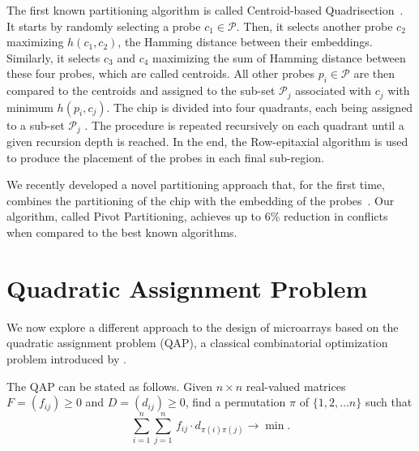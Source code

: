 \documentclass[english]{lni}
\newcommand{\ignore}[1]{}
\begin{document}
The first known partitioning algorithm is called Centroid-based
Quadrisection~\cite{KAHNG03B}. It starts by randomly selecting a probe
$c_1 \in \mathcal{P}$. Then, it selects another probe $c_2$ maximizing
$h(c_1,c_2)$, the Hamming distance between their embeddings. Similarly, it
selects $c_3$ and $c_4$ maximizing the sum of Hamming distance between these
four probes, which are called centroids. All other probes $p_i \in \mathcal{P}$
are then compared to the centroids and assigned to the sub-set $\mathcal{P}_j$
associated with $c_j$ with minimum $h(p_i,c_j)$. The chip is divided into four
quadrants, each being assigned to a sub-set $\mathcal{P}_j$ .  The procedure
is repeated recursively on each quadrant until a given recursion depth is
reached. In the end, the Row-epitaxial algorithm is used to produce the
placement of the probes in each final sub-region.

We recently developed a novel partitioning approach that, for the first
time, combines the partitioning of the chip with the embedding of the
probes~\cite{CARVALHO06}. Our algorithm, called Pivot Partitioning, achieves
up to 6\% reduction in conflicts when compared to the best known algorithms.

\ignore{
Their results show that the running time of the row-epitaxial algorithm
drops significantly with increasing recursion depth. The time required to place
the probes of a 500\,x\,500 chip, for instance, dropped by 69\% with $L = 3$
when compared with the time required by the row-epitaxial without any
partitioning.
It is not clear from their experiments, however, how the choice of $L$ impaired
the performance of the row-epitaxial algorithm in terms of solution quality
since they have restricted their experiments to $L \leq 3$. Moreover, there is
no clear trend toward reduction or increase in border length as $L$ varies
from~0 to~3.
}

\section{Quadratic Assignment Problem}
\label{sec:qap}

We now explore a different approach to the design of microarrays based on the
quadratic assignment problem (QAP), a classical combinatorial optimization
problem introduced by \cite{KOOPMANS57}.

The QAP can be stated as follows. Given $n \times n$ real-valued matrices $F =
(f_{ij})\geq 0$ and $D = (d_{ij})\geq 0$, find a permutation $\pi$ of $\{1, 2,
\ldots n\}$ such that
\begin{equation}\label{eq:qap_def}
  \sum_{i=1}^{n} \sum_{j=1}^{n}\,  f_{ij} \cdot d_{\pi(i)\pi(j)} \to \min.
\end{equation}
\end{document}
